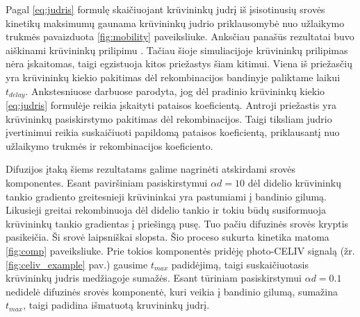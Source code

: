 Pagal \eqref{eq:judris} formulę skaičiuojant krūvininkų judrį iš įsisotinusių srovės kinetikų maksimumų gaunama krūvininkų judrio priklausomybė nuo užlaikymo trukmės pavaizduota \ref{fig:mobility} paveiksliuke. Anksčiau panašūs rezultatai buvo aiškinami krūvininkų prilipimu \cite{juška:2004290}. Tačiau šioje simuliacijoje krūvininkų prilipimas nėra įskaitomas, taigi egzistuoja kitos priežastys šiam kitimui. Viena iš priežasčių yra krūvininkų kiekio pakitimas dėl rekombinacijos bandinyje paliktame laikui $t_{delay}$. Ankstesniuose darbuose \cite{juška:155202} parodyta, jog dėl pradinio krūvininkų kiekio \eqref{eq:judris} formulėje reikia įskaityti pataisos koeficientą. Antroji priežastis yra krūvininkų pasiskirstymo pakitimas dėl rekombinacijos. Taigi tiksliam judrio įvertinimui reikia suskaičiuoti papildomą pataisos koeficientą, priklausantį nuo užlaikymo trukmės ir rekombinacijos koeficiento.

Difuzijos įtaką šiems rezultatams galime nagrinėti atskirdami srovės komponentes. Esant paviršiniam pasiskirstymui $\alpha d = 10$ dėl didelio krūvininkų tankio gradiento greitesnieji krūvininkai yra pastumiami į bandinio gilumą. Likusieji greitai rekombinuoja dėl didelio tankio ir tokiu būdų susiformuoja krūvininkų tankio gradientas į priešingą pusę. Tuo pačiu difuzinės srovės kryptis pasikeičia. Ši srovė laipsniškai slopsta. Šio proceso sukurta kinetika matoma \ref{fig:comp} paveiksliuke. Prie tokios komponentės pridėję photo-CELIV signalą (žr. \ref{fig:celiv_example} pav.) gausime $t_{max}$ padidėjimą, taigi suskaičiuotasis krūvininkų judris medžiagoje sumažės. Esant tūriniam pasiskirstymui $\alpha d = 0.1$ nedidelė difuzinės srovės komponentė, kuri veikia į bandinio gilumą, sumažina $t_{max}$, taigi padidina išmatuotą kruvininkų judrį.
